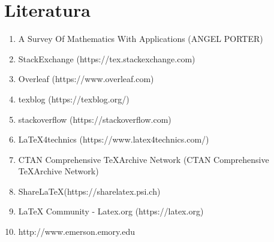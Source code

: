 \documentclass[a4paper,14pt,svgnames]{article}
\begin{document}
\newpage
\section*{\textbf{Literatura}}
\bigskip\bigskip
\large
\begin{enumerate}
\item A Survey Of Mathematics With Applications (ANGEL PORTER)
\item StackExchange (https://tex.stackexchange.com)
\item Overleaf (https://www.overleaf.com)
\item texblog (https://texblog.org/)
\item stackoverflow (https://stackoverflow.com)
\item \LaTeX 4technics (https://www.latex4technics.com/)
\item CTAN Comprehensive \TeX Archive Network (CTAN Comprehensive \TeX Archive Network)
\item Share\LaTeX (https://sharelatex.psi.ch)
\item LaTeX Community - Latex.org (https://latex.org)
\item http://www.emerson.emory.edu
\end{enumerate}

\end{document}
